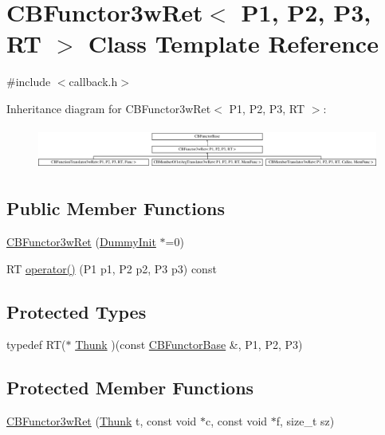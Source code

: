 \hypertarget{class_c_b_functor3w_ret}{\section{C\+B\+Functor3w\+Ret$<$ P1, P2, P3, R\+T $>$ Class Template Reference}
\label{class_c_b_functor3w_ret}
}


{\ttfamily \#include $<$callback.\+h$>$}

Inheritance diagram for C\+B\+Functor3w\+Ret$<$ P1, P2, P3, R\+T $>$\+:\begin{figure}[H]
\begin{center}
\leavevmode
\includegraphics[height=1.396509cm]{class_c_b_functor3w_ret}
\end{center}
\end{figure}
\subsection*{Public Member Functions}
\begin{DoxyCompactItemize}
\item 
\hyperlink{class_c_b_functor3w_ret_a08ea6865a07c2eb4d3ced36cbd507803}{C\+B\+Functor3w\+Ret} (\hyperlink{class_c_b_functor_base_1_1_dummy_init}{Dummy\+Init} $\ast$=0)
\item 
R\+T \hyperlink{class_c_b_functor3w_ret_a00518cbfceca05d2f590658dff0a9120}{operator()} (P1 p1, P2 p2, P3 p3) const 
\end{DoxyCompactItemize}
\subsection*{Protected Types}
\begin{DoxyCompactItemize}
\item 
typedef R\+T($\ast$ \hyperlink{class_c_b_functor3w_ret_a28be2de52494ff3319af034bcc3584aa}{Thunk} )(const \hyperlink{class_c_b_functor_base}{C\+B\+Functor\+Base} \&, P1, P2, P3)
\end{DoxyCompactItemize}
\subsection*{Protected Member Functions}
\begin{DoxyCompactItemize}
\item 
\hyperlink{class_c_b_functor3w_ret_afe7af77cff476cbe4b0e8e495d3ba3a4}{C\+B\+Functor3w\+Ret} (\hyperlink{class_c_b_functor3w_ret_a28be2de52494ff3319af034bcc3584aa}{Thunk} t, const void $\ast$c, const void $\ast$f, size\+\_\+t sz)
\end{DoxyCompactItemize}
